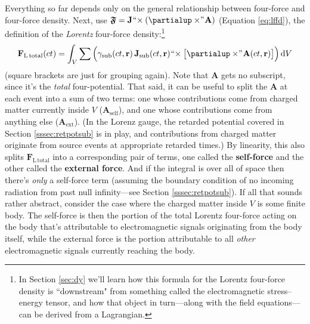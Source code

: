 \documentclass[12pt]{article}
\renewcommand{\vv}[1]{\mathbf{#1}}
\newcommand{\dd}[1]{\mathrm{d}#1}
\begin{document}
Everything so far depends only on the general relationship between four-force and four-force density. Next, use $\bm{\mathfrak{F}} = \vv J \mkern1mu `` \mkern-4mu \times (\partialup \times \mkern-4mu " \mkern1mu \vv A)$ (Equation \ref{eq:lffd}), the definition of the \emph{Lorentz} four-force density:\footnote{In Section \ref{sec:dy} we'll learn how this formula for the Lorentz four-force density is ``downstream" from something called the electromagnetic stress--energy tensor, and how that object in turn---along with the field equations---can be derived from a Lagrangian.}
\begin{equation*}
\vv F_{\mathrm{L \, total}} (ct) = \int_V \sum \Big(\gamma_{\mathrm{sub}} (ct, \vv r) \, \vv J_{\mathrm{sub}} (ct, \vv r) \mkern1mu `` \mkern-4mu \times \big[ \partialup \times \mkern-4mu " \mkern1mu \vv A(ct, \vv r) \big] \Big) \, \dd V
\end{equation*}
(square brackets are just for grouping again). Note that $\vv A$ gets no subscript, since it's the \emph{total} four-potential. That said, it can be useful to split the $\vv A$ at each event into a sum of two terms: one whose contributions come from charged matter currently inside $V$ ($\vv A_{\mathrm{self}}$), and one whose contributions come from anything else ($\vv A_{\mathrm{ext}}$). (In the Lorenz gauge, the retarded potential covered in Section \ref{sssec:retpotsub} is in play, and contributions from charged matter originate from source events at appropriate retarded times.) By linearity, this also splits $\vv F_{\mathrm{L \, total}}$ into a corresponding pair of terms, one called the \textbf{self-force} and the other called the \textbf{external force}. And if the integral is over all of space then there's \emph{only} a self-force term (assuming the boundary condition of no incoming radiation from past null infinity---see Section \ref{sssec:retpotsub}). If all that sounds rather abstract, consider the case where the charged matter inside $V$ is some finite body. The self-force is then the portion of the total Lorentz four-force acting on the body that's attributable to electromagnetic signals originating from the body itself, while the external force is the portion attributable to all \emph{other} electromagnetic signals currently reaching the body.
\end{document}
